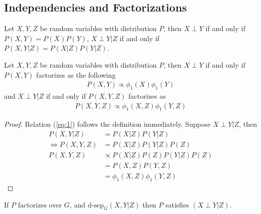 \documentclass[11pt]{article}
\newcommand{\dsep}[0]{\text{d-sep}}
\newcommand{\pa}[0]{\text{Par}}
\begin{document}
	\subsection{Independencies and Factorizations}
	\begin{definition}
		Let $X, Y, Z$ be random variables with distribution $P$, then $X \perp Y$ if and only if $P(X, Y) = P(X)P(Y)$, $X \perp Y | Z$ if and only if $P(X, Y|Z) = P(X|Z)P(Y|Z)$.
	\end{definition}
	
	\begin{proposition}
		Let $X, Y, Z$ be random variables with distribution $P$, then $X \perp Y$ if and only if $P(X,Y)$ factorizes as the following
		\begin{align}
			P(X, Y) \propto \phi_1(X) \phi_1(Y) \label{eq:1}
		\end{align}
		and $X \perp Y|Z$ if and only if $P(X, Y, Z)$ factorizes as
		\begin{align}
			P(X, Y, Z) \propto \phi_1(X, Z) \phi_1(Y, Z) \label{eq:2}
		\end{align}
		
		\begin{proof}
			Relation (\ref{eq:1}) follows the definition immediately.
			Suppose $X \perp Y|Z$, then
			\begin{align}
				P(X, Y | Z) &= P(X|Z)P(Y|Z) \\
				\iff P(X,Y,Z) &= P(X|Z)P(Y|Z)P(Z) \\
				P(X,Y,Z) &\propto P(X|Z)P(Z)P(Y|Z)P(Z) \\
				&= P(X,Z) P(Y,Z) \\
				&= \phi_1(X, Z) \phi_1(Y, Z)
			\end{align}
		\end{proof}
	\end{proposition}
	
	
	\begin{theorem}
		If $P$ factorizes over $G$, and $\dsep_G(X,Y|Z)$ then $P$ satisfies $(X\perp Y|Z)$.
	\end{theorem}
	
\end{document}
